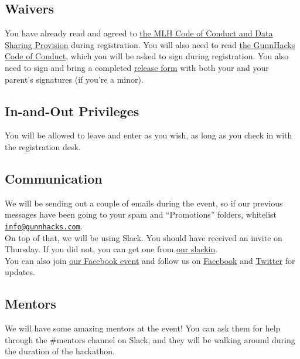 \documentclass[12pt,onesided,letterpaper]{article}
\begin{document}
\subsection*{Waivers}

You have already read and agreed to \href{http://static.mlh.io/docs/mlh-code-of-conduct.pdf}{\underline{the MLH Code of Conduct and Data Sharing Provision}} during registration. You will also need to read \href{https://gunnhacks.com/code.pdf}{\underline{the GunnHacks Code of Conduct}}, which you will be asked to sign during registration. You also need to sign and bring a completed \href{https://gunnhacks.com/waiver.pdf}{\underline{release form}} with both your and your parent's signatures (if you're a minor).

\subsection*{In-and-Out Privileges}

You will be allowed to leave and enter as you wish, as long as you check in with the registration desk.

\subsection*{Communication}

We will be sending out a couple of emails during the event, so if our previous messages have been going to your spam and ``Promotions'' folders, whitelist \href{mailto:info@gunnhacks.com}{\underline{\texttt{info@gunnhacks.com}}}.\\

On top of that, we will be using Slack. You should have received an invite on Thursday. If you did not, you can get one from \href{https://slack.gunnhacks.com}{\underline{our slackin}}.\\

You can also join \href{https://www.facebook.com/events/1706103592980386/}{\underline{our Facebook event}} and follow us on \href{https://www.facebook.com/GunnHacks}{\underline{Facebook}} and \href{https://twitter.com/GunnHacks}{\underline{Twitter}} for updates.

\subsection*{Mentors}

We will have some amazing mentors at the event! You can ask them for help through the \#mentors channel on Slack, and they will be walking around during the duration of the hackathon.
\end{document}
